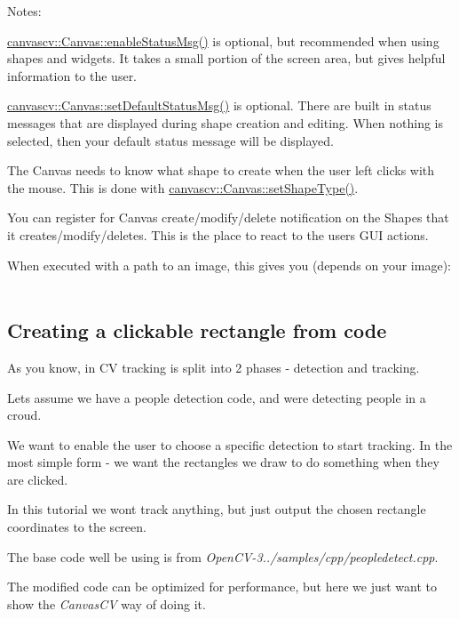  Notes\+:
\begin{DoxyItemize}
\item \hyperlink{classcanvascv_1_1Canvas_a402c43a42c0089c48a96e5303c1c1fe8}{canvascv\+::\+Canvas\+::enable\+Status\+Msg()} is optional, but recommended when using shapes and widgets. It takes a small portion of the screen area, but gives helpful information to the user.
\item \hyperlink{classcanvascv_1_1Canvas_a14828809edd29d789170284a86f16f23}{canvascv\+::\+Canvas\+::set\+Default\+Status\+Msg()} is optional. There are built in status messages that are displayed during shape creation and editing. When nothing is selected, then your default status message will be displayed.
\item The Canvas needs to know what shape to create when the user left clicks with the mouse. This is done with \hyperlink{classcanvascv_1_1Canvas_ac61735c6f4cb6a88d84331540ab25d39}{canvascv\+::\+Canvas\+::set\+Shape\+Type()}.
\item You can register for Canvas create/modify/delete notification on the Shapes that it creates/modify/deletes. This is the place to react to the user\textquotesingle{}s G\+UI actions.
\item When executed with a path to an image, this gives you (depends on your image)\+:  ~\newline

\end{DoxyItemize}\hypertarget{tutshapes_shapes_s2}{}\subsection{Creating a clickable rectangle from code}\label{tutshapes_shapes_s2}
As you know, in CV tracking is split into 2 phases -\/ detection and tracking.

Let\textquotesingle{}s assume we have a people detection code, and we\textquotesingle{}re detecting people in a croud.

We want to enable the user to choose a specific detection to start tracking. In the most simple form -\/ we want the rectangles we draw to do something when they are clicked.

In this tutorial we won\textquotesingle{}t track anything, but just output the chosen rectangle coordinates to the screen.

The base code we\textquotesingle{}ll be using is from {\itshape Open\+C\+V-\/3../samples/cpp/peopledetect.cpp}.

The modified code can be optimized for performance, but here we just want to show the {\itshape Canvas\+CV} way of doing it.

